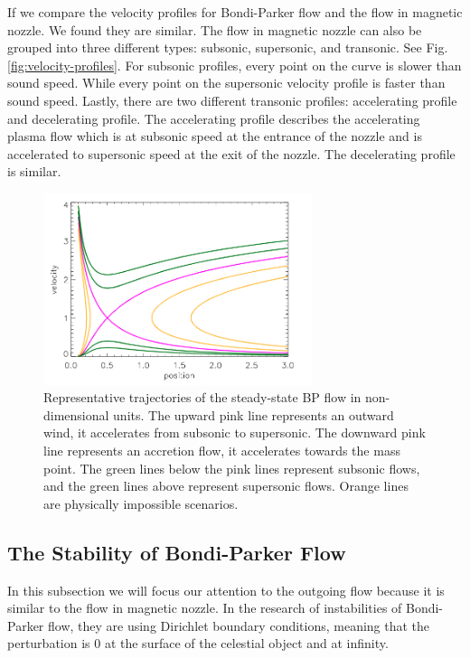 If we compare the velocity profiles for Bondi-Parker flow and the flow in magnetic nozzle. We found they are similar. The flow in magnetic nozzle can also be grouped into three different types: subsonic, supersonic, and transonic. See Fig.\ref{fig:velocity-profiles}. For subsonic profiles, every point on the curve is slower than sound speed. While every point on the supersonic velocity profile is faster than sound speed. Lastly, there are two different transonic profiles: accelerating profile and decelerating profile. The accelerating profile describes the accelerating plasma flow which is at subsonic speed at the entrance of the nozzle and is accelerated to supersonic speed at the exit of the nozzle. The decelerating profile is similar.

\begin{figure}[htbp]
	\centering
	\includegraphics[width=0.7\textwidth]{img/steady-state-BP-flow}
	\caption{Representative trajectories of the steady-state BP flow in non-dimensional units. \cite{keto_stability_2020} The upward pink line represents an outward wind, it accelerates from subsonic to supersonic. The downward pink line represents an accretion flow, it accelerates towards the mass point. The green lines below the pink lines represent subsonic flows, and the green lines above represent supersonic flows. Orange lines are physically impossible scenarios.}
	\label{fig:BP-flow-velocity}
\end{figure}

\subsection{The Stability of Bondi-Parker Flow}
In this subsection we will focus our attention to the outgoing flow because it is similar to the flow in magnetic nozzle. In the research \cite{velli_from_1994,del_dynamical_1998} of instabilities of Bondi-Parker flow, they are using Dirichlet boundary conditions, meaning that the perturbation is 0 at the surface of the celestial object and at infinity.

